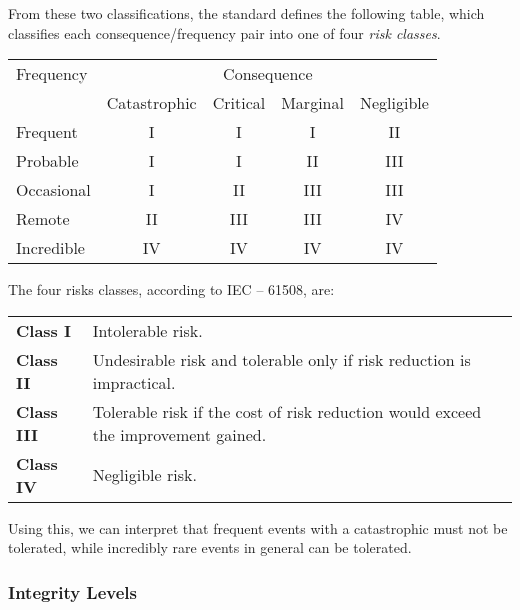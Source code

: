

From these two classifications, the standard defines the following table, which classifies each consequence/frequency pair into one of four \emph{risk classes}.

\begin{center}
    \begin{tabular}{lcccc}
	\toprule
	Frequency & \multicolumn{4}{c}{Consequence}\\\cmidrule{2-5}
                  & Catastrophic & Critical & Marginal & Negligible \\
	\midrule
	Frequent & I & I & I & II \\
	Probable & I & I & II & III\\
	Occasional & I & II & III & III\\
	Remote & II & III & III & IV \\ 
	Incredible & IV & IV & IV & IV \\
	\bottomrule
    \end{tabular}
\end{center}

The four risks classes, according to IEC -- 61508, are:


\begin{tabular}{ll}

\textbf{Class I} & Intolerable risk.\\

\textbf{Class II} & Undesirable risk and tolerable only if risk
	  	reduction is impractical.\\

\textbf{Class III} & Tolerable risk if the cost of risk reduction
		would exceed the improvement gained.\\

\textbf{Class IV} & Negligible risk.

\end{tabular}

Using this, we can interpret that frequent events with a catastrophic must not be tolerated, while incredibly rare events in general can be tolerated.




  \subsubsection{Integrity Levels}

